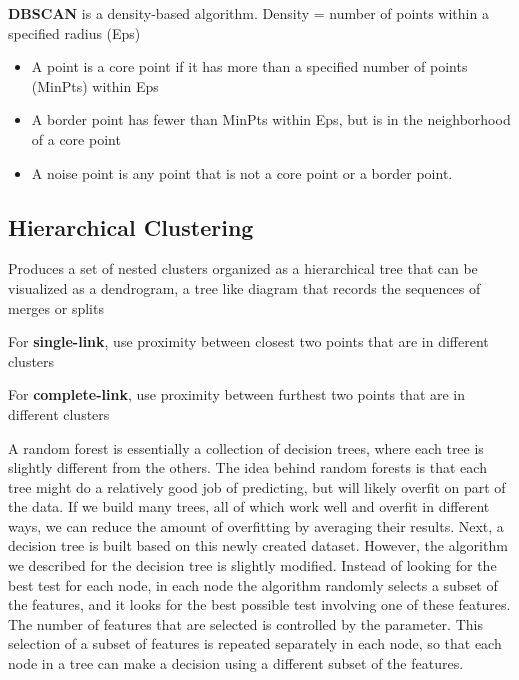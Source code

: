\documentclass[12pt]{amsart}
\begin{document}
\textbf{DBSCAN} is a density-based algorithm.
Density = number of points within a specified radius (Eps)

\begin{itemize}
  \item A point is a core point if it has more than a specified number
of points (MinPts) within Eps

\item A border point has fewer than MinPts within Eps, but is in
the neighborhood of a core point

\item A noise point is any point that is not a core point or a border
point. 
  
  
\end{itemize}




\subsection{Hierarchical Clustering}
Produces a set of nested clusters organized as a
hierarchical tree that can be visualized as a dendrogram, a tree like diagram that records the sequences of
merges or splits

For \textbf{single-link}, use proximity between closest two points that are in different clusters

For \textbf{complete-link}, use proximity between furthest two points that are in different clusters








A random forest is essentially a collection of decision trees, where each tree is slightly different from the others. The idea behind random forests is that each tree might do a relatively good job of predicting, but will likely overfit on part of the data. If we build many trees, all of which work well and overfit in different ways, we can reduce the amount of overfitting by averaging their results. 
Next, a decision tree is built based on this newly created dataset. However, the algorithm we described for the decision tree is slightly modified. Instead of looking for the best test for each node, in each node the algorithm randomly selects a subset of the features, and it looks for the best possible test involving one of these features. The number of features that are selected is controlled by the parameter. This selection of a subset of features is repeated separately in each node, so that each node in a tree can make a decision using a different subset of the features.
\end{document}
